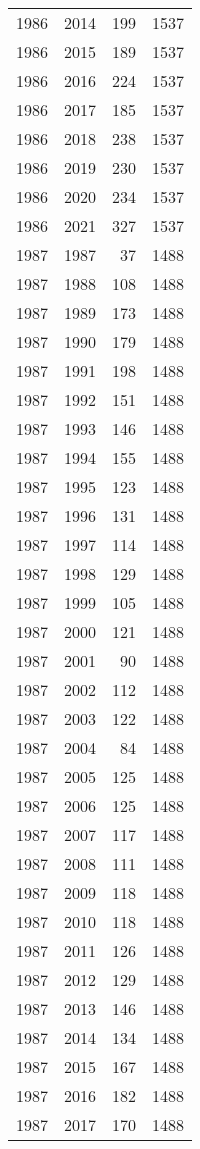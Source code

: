 \documentclass[
  11pt,
  letterpaper,
  DIV=11,
  numbers=noendperiod,
  twoside]{scrartcl}
\begin{document}
\begin{longtable}[]{@{}rrrr@{}}
1986 & 2014 & 199 & 1537 \\
1986 & 2015 & 189 & 1537 \\
1986 & 2016 & 224 & 1537 \\
1986 & 2017 & 185 & 1537 \\
1986 & 2018 & 238 & 1537 \\
1986 & 2019 & 230 & 1537 \\
1986 & 2020 & 234 & 1537 \\
1986 & 2021 & 327 & 1537 \\
1987 & 1987 & 37 & 1488 \\
1987 & 1988 & 108 & 1488 \\
1987 & 1989 & 173 & 1488 \\
1987 & 1990 & 179 & 1488 \\
1987 & 1991 & 198 & 1488 \\
1987 & 1992 & 151 & 1488 \\
1987 & 1993 & 146 & 1488 \\
1987 & 1994 & 155 & 1488 \\
1987 & 1995 & 123 & 1488 \\
1987 & 1996 & 131 & 1488 \\
1987 & 1997 & 114 & 1488 \\
1987 & 1998 & 129 & 1488 \\
1987 & 1999 & 105 & 1488 \\
1987 & 2000 & 121 & 1488 \\
1987 & 2001 & 90 & 1488 \\
1987 & 2002 & 112 & 1488 \\
1987 & 2003 & 122 & 1488 \\
1987 & 2004 & 84 & 1488 \\
1987 & 2005 & 125 & 1488 \\
1987 & 2006 & 125 & 1488 \\
1987 & 2007 & 117 & 1488 \\
1987 & 2008 & 111 & 1488 \\
1987 & 2009 & 118 & 1488 \\
1987 & 2010 & 118 & 1488 \\
1987 & 2011 & 126 & 1488 \\
1987 & 2012 & 129 & 1488 \\
1987 & 2013 & 146 & 1488 \\
1987 & 2014 & 134 & 1488 \\
1987 & 2015 & 167 & 1488 \\
1987 & 2016 & 182 & 1488 \\
1987 & 2017 & 170 & 1488 \\

\end{longtable}
\end{document}
